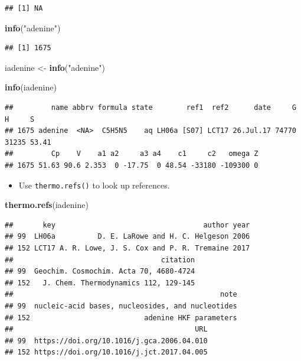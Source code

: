 \documentclass[]{tufte-handout}
\newenvironment{Shaded}{}{}
\newcommand{\KeywordTok}[1]{\textcolor[rgb]{0.00,0.44,0.13}{\textbf{#1}}}
\newcommand{\StringTok}[1]{\textcolor[rgb]{0.25,0.44,0.63}{#1}}
\newcommand{\NormalTok}[1]{#1}
\providecommand{\tightlist}{%
  \setlength{\itemsep}{0pt}\setlength{\parskip}{0pt}}
\begin{document}
\begin{verbatim}
## [1] NA
\end{verbatim}

\begin{Shaded}
\begin{Highlighting}[]
\KeywordTok{info}\NormalTok{(}\StringTok{"adenine"}\NormalTok{)}
\end{Highlighting}
\end{Shaded}

\begin{verbatim}
## [1] 1675
\end{verbatim}

\begin{Shaded}
\begin{Highlighting}[]
\NormalTok{iadenine <-}\StringTok{ }\KeywordTok{info}\NormalTok{(}\StringTok{"adenine"}\NormalTok{)}
\end{Highlighting}
\end{Shaded}

\begin{Shaded}
\begin{Highlighting}[]
\KeywordTok{info}\NormalTok{(iadenine)}
\end{Highlighting}
\end{Shaded}

\begin{verbatim}
##         name abbrv formula state        ref1  ref2      date     G     H     S
## 1675 adenine  <NA>  C5H5N5    aq LH06a [S07] LCT17 26.Jul.17 74770 31235 53.41
##         Cp    V    a1 a2     a3 a4    c1     c2   omega Z
## 1675 51.63 90.6 2.353  0 -17.75  0 48.54 -33180 -109300 0
\end{verbatim}

\begin{itemize}
\tightlist
\item
  Use {\texttt{thermo.refs()}} to look up references.
\end{itemize}

\begin{Shaded}
\begin{Highlighting}[]
\KeywordTok{thermo.refs}\NormalTok{(iadenine)}
\end{Highlighting}
\end{Shaded}

\begin{verbatim}
##       key                                   author year
## 99  LH06a          D. E. LaRowe and H. C. Helgeson 2006
## 152 LCT17 A. R. Lowe, J. S. Cox and P. R. Tremaine 2017
##                                   citation
## 99  Geochim. Cosmochim. Acta 70, 4680-4724
## 152   J. Chem. Thermodynamics 112, 129-145
##                                                 note
## 99  nucleic-acid bases, nucleosides, and nucleotides
## 152                           adenine HKF parameters
##                                           URL
## 99  https://doi.org/10.1016/j.gca.2006.04.010
## 152 https://doi.org/10.1016/j.jct.2017.04.005
\end{verbatim}
\end{document}
